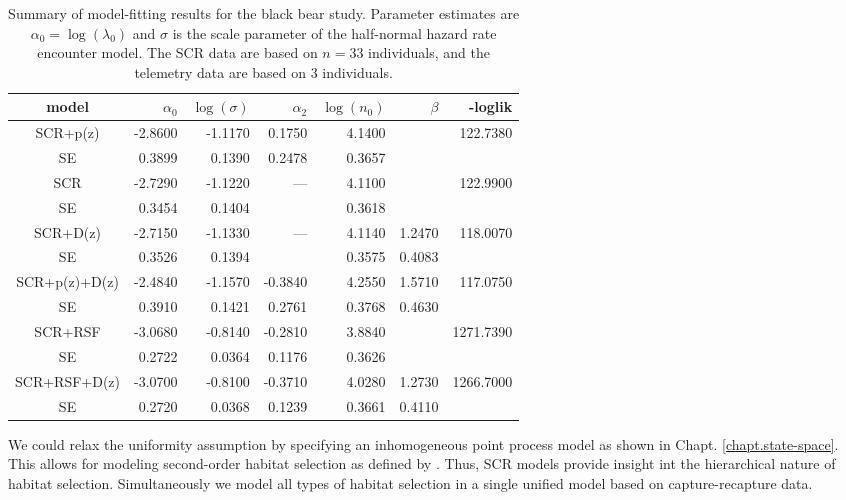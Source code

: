 \begin{table}
\centering
\caption{
Summary of model-fitting results for the black bear study. Parameter
estimates are $\alpha_{0} = \log(\lambda_{0})$ and $\sigma$ is the
scale parameter of the half-normal hazard rate encounter model.
The SCR data are based on $n=33$ individuals, and the telemetry data
are based on 3 individuals.
}
\begin{tabular}{c|rrrrrr}
\hline \hline
model         & $\alpha_0$ & $\log(\sigma)$ & $\alpha_{2}$ & $\log(n_{0})$ & 
$\beta$       & -loglik                                                                         \\ \hline
SCR+p(z)      & -2.8600    & -1.1170        & 0.1750       & 4.1400        &        & 122.7380  \\
   SE         & 0.3899     & 0.1390         & 0.2478       & 0.3657        &        &           \\
 SCR          & -2.7290    & -1.1220        & ---          & 4.1100        &        & 122.9900  \\
   SE         & 0.3454     & 0.1404         &              & 0.3618        &        &           \\
SCR+D(z)      & -2.7150    & -1.1330        & ---          & 4.1140        & 1.2470 & 118.0070  \\
   SE         & 0.3526     & 0.1394         &              & 0.3575        & 0.4083 &           \\
SCR+p(z)+D(z) & -2.4840    & -1.1570        & -0.3840      & 4.2550        & 1.5710 & 117.0750  \\
   SE         & 0.3910     & 0.1421         & 0.2761       & 0.3768        & 0.4630 &           \\
SCR+RSF       & -3.0680    & -0.8140        & -0.2810      & 3.8840        &        & 1271.7390 \\
   SE         & 0.2722     & 0.0364         & 0.1176       & 0.3626        &        &           \\
SCR+RSF+D(z)  & -3.0700    & -0.8100        & -0.3710      & 4.0280        & 1.2730 & 1266.7000 \\
   SE         & 0.2720     & 0.0368         & 0.1239       & 0.3661        & 0.4110 &           \\
\hline
\end{tabular}
\label{tab.nyresults}
\end{table}

We could relax the uniformity assumption by specifying an
inhomogeneous point process model \citep{borchers_efford:2008} as
shown in Chapt. \ref{chapt.state-space}.  This allows for modeling
second-order habitat selection as defined by \citet{johnson:1980}.
Thus, SCR models provide insight int the hierarchical nature of
habitat selection.  Simultaneously we model all types of habitat
selection in a single unified model based on capture-recapture data.


